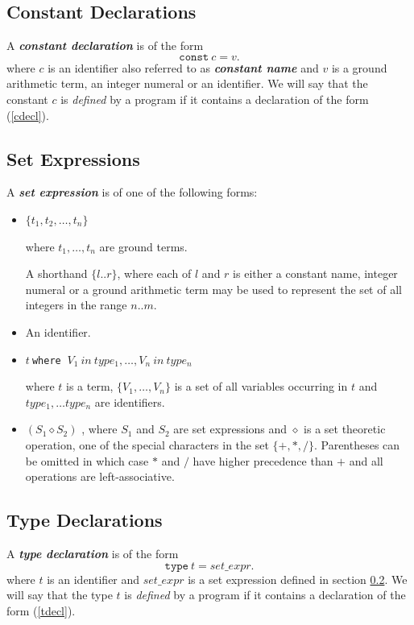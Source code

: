 \documentclass[a4paper,10pt]{article}
\begin{document}
\subsection{Constant Declarations}\label{cd}
A \textit{\textbf{constant declaration}} is of the form 
\begin{equation}\label{cdecl}
\texttt{const} ~c = v.
\end{equation}
where  $c$ is an identifier also referred to as  
\textbf{\textit{constant name}}  and $v$ is a ground arithmetic term, an integer numeral  or an identifier.
We will say that the constant $c$ is \textit{defined} by a program if it contains a declaration of the form (\ref{cdecl}).
\subsection{Set Expressions}\label{sexpr}

A \textbf{\textit{set expression}}  is of one of the following forms:
\begin{itemize}
\item $\{t_1,t_2, \ldots, t_n\}$

 where $t_1,\ldots,t_n$ are ground terms. 

A shorthand $\{l..r\}$, where each of $l$ and $r$ is either a constant name, integer numeral or a ground arithmetic term may be used to represent the  set of all integers in the range $n..m$.

\item An identifier.

\item $t~$\texttt{where} $~V_1~in~type_1,\ldots, V_n~in~type_n$

where $t$ is a term, $\{V_1, \ldots, V_n\}$ is a set of all variables occurring in $t$ and $type_1, \ldots type_n$ are identifiers.

\item $(S_1 \diamond S_2)$ , where $S_1$ and $S_2$ are set expressions and $\diamond$ is a set theoretic operation, one of the special characters in the set $\{+,*,/\}$. Parentheses can be omitted in which case $*$ and $/$ have higher precedence than $+$ and all operations are left-associative.
\end{itemize}

\subsection{Type Declarations}
A \textit{\textbf{type declaration}} is of the form 
\begin{equation}\label{tdecl}
\texttt{type}~t = set\_expr.
\end{equation}
where $t$ is an identifier and $set\_expr$ is a set expression defined in section \ref{sexpr}.
We will say that the type $t$ is \textit{defined} by a program if it contains a declaration of the form (\ref{tdecl}). 
\end{document}
